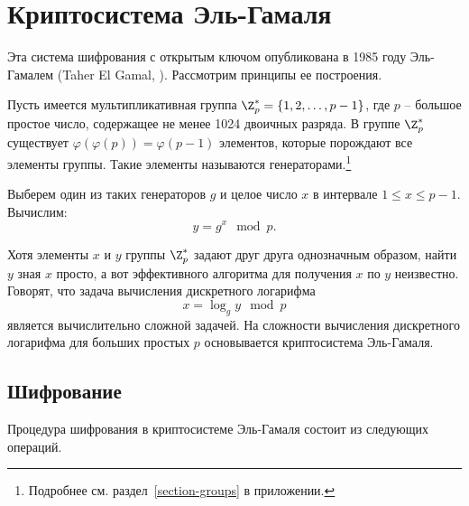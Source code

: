 \section{Криптосистема Эль-Гамаля}

Эта система шифрования с открытым ключом опубликована в 1985 году Эль-Гамалем (Taher El Gamal, \cite{ElGamal:1985}). Рассмотрим принципы ее построения.

Пусть имеется мультипликативная группа $\Z_p^* = \{1, 2, \dots, p-1\}$, где $p$ -- большое простое число, содержащее не менее 1024 двоичных разряда. В  группе $\Z_p^*$ существует $\varphi( \varphi( p ) ) = \varphi( p - 1 )$ элементов, которые порождают все элементы группы. Такие элементы называются генераторами.\footnote{Подробнее см. раздел~\ref{section-groups} в приложении.}

Выберем один из таких генераторов $g$ и целое число $x$ в интервале $1 \le x \le p-1$. Вычислим:
    \[ y = g^x \mod p. \]

Хотя элементы $x$ и $y$ группы $\Z_p^*$ задают друг друга однозначным образом, найти $y$ зная $x$ просто, а вот эффективного алгоритма для получения $x$ по $y$ неизвестно. Говорят, что задача вычисления дискретного логарифма
	\[ x = \log_g y \mod p \]
является вычислительно сложной задачей. На сложности вычисления дискретного логарифма для больших простых $p$ основывается криптосистема Эль-Гамаля.

\subsection{Шифрование}

Процедура шифрования в криптосистеме Эль-Гамаля состоит из следующих операций.

